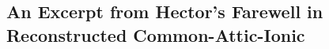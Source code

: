 \begin{appendixes}
    \section[Hector's Farewell (Excerpt)]{An Excerpt from Hector's Farewell in Reconstructed Common-Attic-Ionic}
        
\end{appendixes}